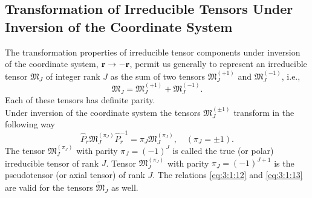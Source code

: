 \subsection{Transformation of Irreducible Tensors Under Inversion of the Coordinate System}\label{sec:3.1.4}
The transformation properties of irreducible tensor components under inversion of the coordinate system, $\mathbf{r} \rightarrow-\mathbf{r}$, permit us generally to represent an irreducible tensor $\mathfrak{M}_{J}$ of integer rank $J$ as the sum of two tensors $\mathfrak{M}_{J}^{(+1)}$ and $\mathfrak{M}_{J}^{(-1)}$, i.e.,
\begin{equation}
\mathfrak{M}_{J}=\mathfrak{M}_{J}^{(+1)}+\mathfrak{M}_{J}^{(-1)}. \label{eq:3:1:12}
\end{equation}
Each of these tensors has definite parity.\\
Under inversion of the coordinate system the tensors $\mathfrak{M}_{J}^{( \pm 1)}$ transform in the following way
\begin{equation}
\widehat{P}_{r} \mathfrak{M}_{J}^{\left(\pi_{J}\right)} \widehat{P}_{r}^{-1}=\pi_{J} \mathfrak{M}_{J}^{\left(\pi_{J}\right)}, \quad\left(\pi_{J}= \pm 1\right) . \label{eq:3:1:13}
\end{equation}
The tensor $\mathfrak{M}_{J}^{\left(\pi_{J}\right)}$ with parity $\pi_{J}=(-1)^{J}$ is called the true (or polar) irreducible tensor of rank $J$. Tensor $\mathfrak{M}_{J}^{\left(\pi_{J}\right)}$ with parity $\pi_{J}=(-1)^{J+1}$ is the pseudotensor (or axial tensor) of rank $J$. The relations \eqref{eq:3:1:12} and \eqref{eq:3:1:13} are valid for the tensors $\widetilde{\mathfrak{M}}_{J}$ as well.


